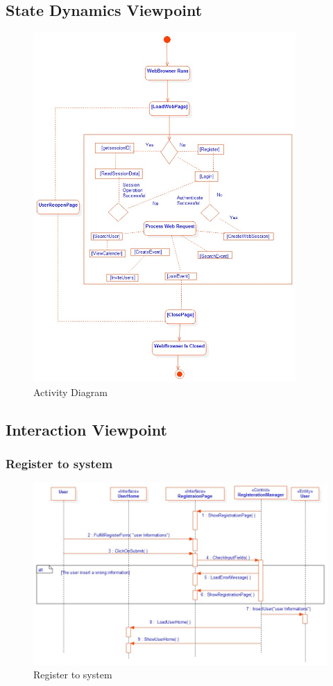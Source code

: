 \subsection{State Dynamics Viewpoint}
\begin{figure}[tbh]
  \begin{center}
  \includegraphics[width=100mm]{activity}
    \caption{Activity Diagram}\label{Fig 1:}
  \end{center}
\end{figure}

\newpage
\subsection{Interaction Viewpoint} 
\subsubsection{Register to system}
\begin{figure}[tbh]
  \begin{center}
  \includegraphics[width=150mm]{1reg}
    \caption{Register to system}\label{Fig 1:}
  \end{center}
\end{figure}
\newpage

